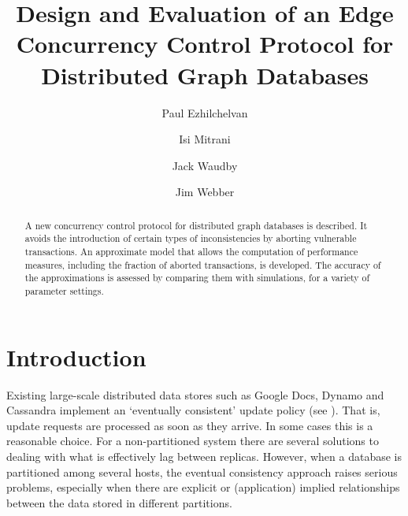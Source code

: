 \documentclass[runningheads]{llncs}
\begin{document}
\title{Design and Evaluation of an Edge Concurrency Control Protocol
 for Distributed Graph Databases}

\author{Paul Ezhilchelvan%
    \and Isi Mitrani%
    \and Jack Waudby \and Jim Webber}

\maketitle

\begin{abstract}
A new concurrency control protocol for distributed graph databases is
described. It avoids the introduction of certain types of inconsistencies
by aborting vulnerable transactions. An approximate model that allows the
computation of performance measures, including the fraction of
aborted transactions, is developed. The accuracy of the approximations
is assessed by comparing them with simulations, for a variety of
parameter settings.
\end{abstract}

\section{Introduction}

Existing large-scale distributed data stores such as Google Docs, Dynamo
\cite{dec} and Cassandra \cite{cas} implement an `eventually consistent'
update policy (see \cite{vog}). That is, update requests are processed as
soon as they arrive. In some cases this is a reasonable choice. For a
non-partitioned system there are several solutions to dealing with what is
effectively lag between replicas. However, when a database is partitioned
among several hosts, the eventual consistency approach raises serious
problems, especially when there are explicit or (application) implied
relationships between the data stored in different partitions.
\end{document}
